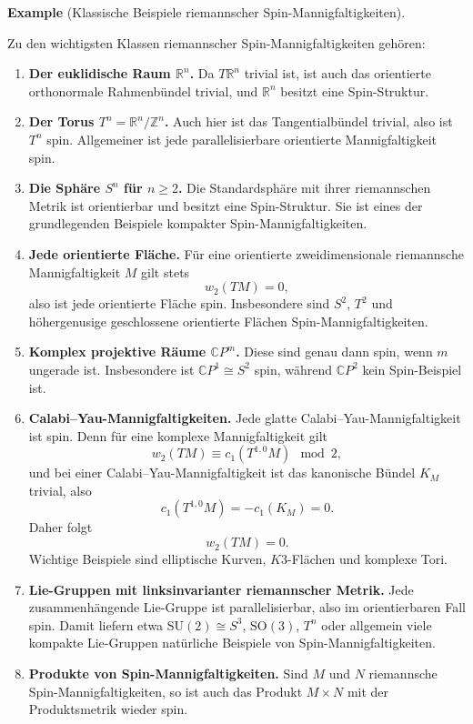 \documentclass[10pt, letterpaper]{article}
\newcommand{\R}{\mathbb{R}}
\newcommand{\Z}{\mathbb{Z}}
\newcommand{\SO}{\mathrm{SO}}
\newcommand{\SU}{\mathrm{SU}}
\newcommand{\CP}{\mathbb{C}P}
\newcommand{\CustomHeading}[3]{%
  \par\medskip\noindent%
  \textbf{#1 #2} \textnormal{(#3)}.\enskip%
}
\newenvironment{EXA}[2]{\CustomHeading{Example}{#1}{#2}}{}
\begin{document}
\begin{EXA}{}{Klassische Beispiele riemannscher Spin-Mannigfaltigkeiten}
Zu den wichtigsten Klassen riemannscher Spin-Mannigfaltigkeiten gehören:

\begin{enumerate}
    \item \textbf{Der euklidische Raum \(\R^n\).}  
    Da \(T\R^n\) trivial ist, ist auch das orientierte orthonormale Rahmenbündel trivial, und \(\R^n\) besitzt eine Spin-Struktur.

    \item \textbf{Der Torus \(T^n=\R^n/\Z^n\).}  
    Auch hier ist das Tangentialbündel trivial, also ist \(T^n\) spin. Allgemeiner ist jede parallelisierbare orientierte Mannigfaltigkeit spin.

    \item \textbf{Die Sphäre \(S^n\) für \(n\ge 2\).}  
    Die Standardsphäre mit ihrer riemannschen Metrik ist orientierbar und besitzt eine Spin-Struktur. Sie ist eines der grundlegenden Beispiele kompakter Spin-Mannigfaltigkeiten.

    \item \textbf{Jede orientierte Fläche.}  
    Für eine orientierte zweidimensionale riemannsche Mannigfaltigkeit \(M\) gilt stets
    \[
    w_2(TM)=0,
    \]
    also ist jede orientierte Fläche spin. Insbesondere sind \(S^2\), \(T^2\) und höhergenusige geschlossene orientierte Flächen Spin-Mannigfaltigkeiten.

    \item \textbf{Komplex projektive Räume \(\CP^m\).}  
    Diese sind genau dann spin, wenn \(m\) ungerade ist. Insbesondere ist \(\CP^1\cong S^2\) spin, während \(\CP^2\) kein Spin-Beispiel ist.

    \item \textbf{Calabi--Yau-Mannigfaltigkeiten.}  
    Jede glatte Calabi--Yau-Mannigfaltigkeit ist spin. Denn für eine komplexe Mannigfaltigkeit gilt
    \[
    w_2(TM)\equiv c_1(T^{1,0}M)\mod 2,
    \]
    und bei einer Calabi--Yau-Mannigfaltigkeit ist das kanonische Bündel \(K_M\) trivial, also
    \[
    c_1(T^{1,0}M)=-c_1(K_M)=0.
    \]
    Daher folgt
    \[
    w_2(TM)=0.
    \]
    Wichtige Beispiele sind elliptische Kurven, \(K3\)-Flächen und komplexe Tori.
    
    \item \textbf{Lie-Gruppen mit linksinvarianter riemannscher Metrik.}  
    Jede zusammenhängende Lie-Gruppe ist parallelisierbar, also im orientierbaren Fall spin. Damit liefern etwa \(\SU(2)\cong S^3\), \(\SO(3)\), \(T^n\) oder allgemein viele kompakte Lie-Gruppen natürliche Beispiele von Spin-Mannigfaltigkeiten.

    \item \textbf{Produkte von Spin-Mannigfaltigkeiten.}  
    Sind \(M\) und \(N\) riemannsche Spin-Mannigfaltigkeiten, so ist auch das Produkt \(M\times N\) mit der Produktsmetrik wieder spin.
\end{enumerate}

\end{EXA}
\end{document}
